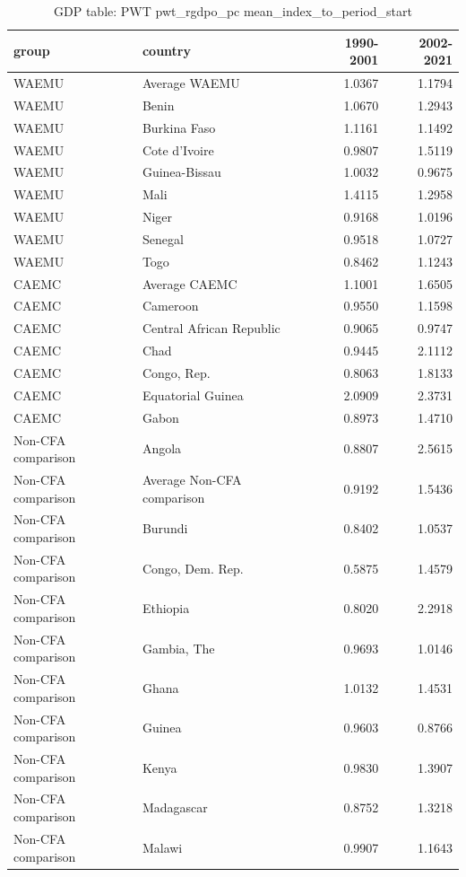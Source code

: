 \begin{table}

\caption{GDP table: PWT pwt_rgdpo_pc mean_index_to_period_start}
\centering
\begin{tabular}[t]{llrr}
\toprule
group & country & 1990-2001 & 2002-2021\\
\midrule
WAEMU & Average WAEMU & 1.0367 & 1.1794\\
WAEMU & Benin & 1.0670 & 1.2943\\
WAEMU & Burkina Faso & 1.1161 & 1.1492\\
WAEMU & Cote d'Ivoire & 0.9807 & 1.5119\\
WAEMU & Guinea-Bissau & 1.0032 & 0.9675\\
\addlinespace
WAEMU & Mali & 1.4115 & 1.2958\\
WAEMU & Niger & 0.9168 & 1.0196\\
WAEMU & Senegal & 0.9518 & 1.0727\\
WAEMU & Togo & 0.8462 & 1.1243\\
CAEMC & Average CAEMC & 1.1001 & 1.6505\\
\addlinespace
CAEMC & Cameroon & 0.9550 & 1.1598\\
CAEMC & Central African Republic & 0.9065 & 0.9747\\
CAEMC & Chad & 0.9445 & 2.1112\\
CAEMC & Congo, Rep. & 0.8063 & 1.8133\\
CAEMC & Equatorial Guinea & 2.0909 & 2.3731\\
\addlinespace
CAEMC & Gabon & 0.8973 & 1.4710\\
Non-CFA comparison & Angola & 0.8807 & 2.5615\\
Non-CFA comparison & Average Non-CFA comparison & 0.9192 & 1.5436\\
Non-CFA comparison & Burundi & 0.8402 & 1.0537\\
Non-CFA comparison & Congo, Dem. Rep. & 0.5875 & 1.4579\\
\addlinespace
Non-CFA comparison & Ethiopia & 0.8020 & 2.2918\\
Non-CFA comparison & Gambia, The & 0.9693 & 1.0146\\
Non-CFA comparison & Ghana & 1.0132 & 1.4531\\
Non-CFA comparison & Guinea & 0.9603 & 0.8766\\
Non-CFA comparison & Kenya & 0.9830 & 1.3907\\
\addlinespace
Non-CFA comparison & Madagascar & 0.8752 & 1.3218\\
Non-CFA comparison & Malawi & 0.9907 & 1.1643\\

\end{tabular}
\end{table}
